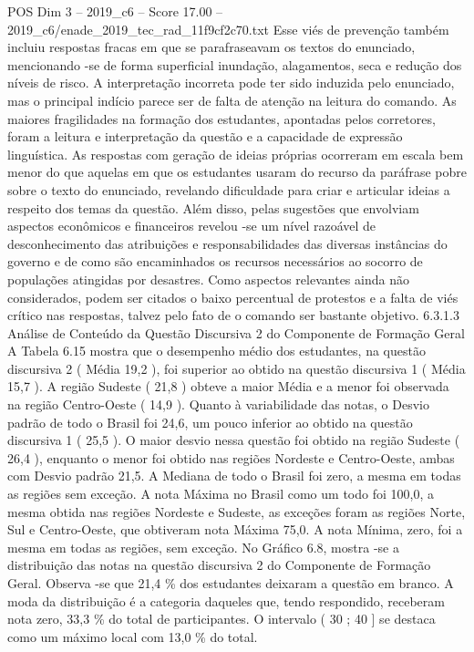 \begin{textsample}{POS Dim 3 – 2019\_c6 – Score 17.00 – 2019\_c6/enade\_2019\_tec\_rad\_11f9cf2c70.txt}
Esse viés de prevenção também incluiu respostas fracas em que se parafraseavam os textos do enunciado, mencionando -se de forma superficial inundação, alagamentos, seca e redução dos níveis de risco.
A interpretação incorreta pode ter sido induzida pelo enunciado, mas o principal indício parece ser de falta de atenção na leitura do comando.
As maiores fragilidades na formação dos estudantes, apontadas pelos corretores, foram a leitura e interpretação da questão e a capacidade de expressão linguística.
As respostas com geração de ideias próprias ocorreram em escala bem menor do que aquelas em que os estudantes usaram do recurso da paráfrase pobre sobre o texto do enunciado, revelando dificuldade para criar e articular ideias a respeito dos temas da questão.
Além disso, pelas sugestões que envolviam aspectos econômicos e financeiros revelou -se um nível razoável de desconhecimento das atribuições e responsabilidades das diversas instâncias do governo e de como são encaminhados os recursos necessários ao socorro de populações atingidas por desastres.
Como aspectos relevantes ainda não considerados, podem ser citados o baixo percentual de protestos e a falta de viés crítico nas respostas, talvez pelo fato de o comando ser bastante objetivo. 6.3.1.3 Análise de Conteúdo da Questão Discursiva 2 do Componente de Formação Geral A Tabela 6.15 mostra que o desempenho médio dos estudantes, na questão discursiva 2 ( Média 19,2 ), foi superior ao obtido na questão discursiva 1 ( Média 15,7 ).
A região Sudeste ( 21,8 ) obteve a maior Média e a menor foi observada na região Centro-Oeste ( 14,9 ).
Quanto à variabilidade das notas, o Desvio padrão de todo o Brasil foi 24,6, um pouco inferior ao obtido na questão discursiva 1 ( 25,5 ).
O maior desvio nessa questão foi obtido na região Sudeste ( 26,4 ), enquanto o menor foi obtido nas regiões Nordeste e Centro-Oeste, ambas com Desvio padrão 21,5.
A Mediana de todo o Brasil foi zero, a mesma em todas as regiões sem exceção.
A nota Máxima no Brasil como um todo foi 100,0, a mesma obtida nas regiões Nordeste e Sudeste, as exceções foram as regiões Norte, Sul e Centro-Oeste, que obtiveram nota Máxima 75,0.
A nota Mínima, zero, foi a mesma em todas as regiões, sem exceção.
No Gráfico 6.8, mostra -se a distribuição das notas na questão discursiva 2 do Componente de Formação Geral.
Observa -se que 21,4 \% dos estudantes deixaram a questão em branco.
A moda da distribuição é a categoria daqueles que, tendo respondido, receberam nota zero, 33,3 \% do total de participantes.
O intervalo ( 30 ; 40 ] se destaca como um máximo local com 13,0 \% do total.

\end{textsample}
